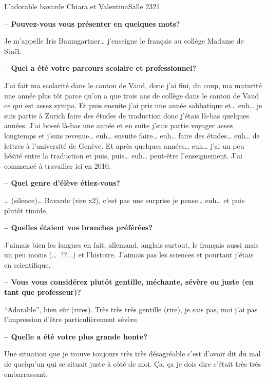 \documentclass{parch}
\begin{document}
	{
		\begin{parchArticle}[2]{L’adorable bavarde}
			{Chiara et Valentina}{Salle 232}{1}
			\begingroup
			\setlength{\parindent}{0pt}
			
			
			\textbf{-- Pouvez-vous vous présenter en quelques mots?}
			
			Je m’appelle Iris Baumgartner… j’enseigne le français au collège Madame de Staël.
			
			\textbf{-- Quel a été votre parcours scolaire et professionnel?}
			
			J’ai fait ma scolarité dans le canton de Vaud, donc j’ai fini, du coup, ma maturité une année plus tôt parce qu’on a que trois ans de collège dans le canton de Vaud ce qui est assez sympa. Et puis ensuite j’ai pris une année sabbatique et… euh… je suis partie à Zurich faire des études de traduction donc j’étais là-bas quelques années. J’ai bossé là-bas une année et en suite j’suis partie voyager assez longtemps et j’suis revenue… euh… ensuite faire… euh… faire des études… euh… de lettres à l’université de Genève. Et après quelques années… euh… j’ai un peu hésité entre la traduction et puis, puis… euh… peut-être l’enseignement. J’ai commencé à travailler ici en 2010.
			
			\textbf{-- Quel genre d’élève étiez-vous?}
			
			… (silence)… Bavarde (rire x2), c’est pas une surprise je pense… euh… et puis plutôt timide.
			
			\textbf{-- Quelles étaient vos branches préférées?}\newpage
			
			J’aimais bien les langues en fait, allemand, anglais surtout, le français aussi mais un peu moins (… ??...) et l’histoire. J’aimais pas les sciences et pourtant j’étais en scientifique.
			
			\textbf{-- Vous vous considérez plutôt gentille, méchante, sévère ou juste (en tant que professeur)?}
			
			\enquote{Adorable}, bien sûr (rires). Très très très gentille (rire), je sais pas, moi j’ai pas l’impression d’être particulièrement sévère.
			
			\textbf{-- Quelle a été votre plus grande honte?}
			
			Une situation que je trouve toujours très très désagréable c’est d’avoir dit du mal de quelqu’un qui se situait juste à côté de moi. Ça, ça je dois dire c’était très très embarrassant.
			

\end{parchArticle}}
\end{document}
